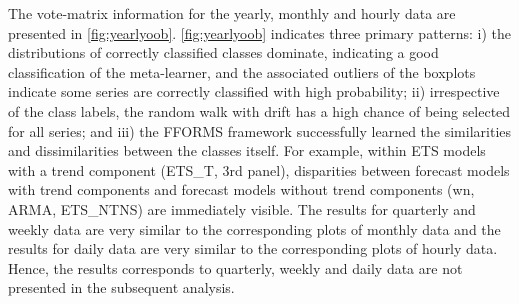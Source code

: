 \documentclass[11pt,a4paper,]{article}
\begin{document}
The vote-matrix information for the yearly, monthly and hourly data are presented in \autoref{fig:yearlyoob}. \autoref{fig:yearlyoob} indicates three primary patterns: i) the distributions of correctly classified classes dominate, indicating a good classification of the meta-learner, and the associated outliers of the boxplots indicate some series are correctly classified with high probability; ii) irrespective of the class labels, the random walk with drift has a high chance of being selected for all series; and iii) the FFORMS framework successfully learned the similarities and dissimilarities between the classes itself. For example, within ETS models with a trend component (ETS\_T, 3rd panel), disparities between forecast models with trend components and forecast models without trend components (wn, ARMA, ETS\_NTNS) are immediately visible. The results for quarterly and weekly data are very similar to the corresponding plots of monthly data and the results for daily data are very similar to the corresponding plots of hourly data. Hence, the results corresponds to quarterly, weekly and daily data are not presented in the subsequent analysis.
\end{document}
